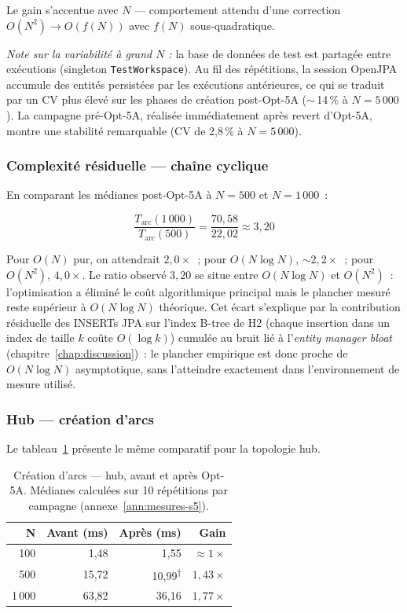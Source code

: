 Le gain s'accentue avec $N$ --- comportement attendu d'une correction
$O(N^2) \rightarrow O(f(N))$ avec $f(N)$ sous-quadratique.

\textit{Note sur la variabilité à grand $N$ :} la base de données de test
est partagée entre exécutions (singleton \texttt{TestWorkspace}). Au fil
des répétitions, la session OpenJPA accumule des entités persistées par
les exécutions antérieures, ce qui se traduit par un CV plus élevé sur
les phases de création post-Opt-5A ($\sim$\,14\,\% à $N=5\,000$). La
campagne pré-Opt-5A, réalisée immédiatement après revert d'Opt-5A,
montre une stabilité remarquable (CV de 2,8\,\% à $N=5\,000$).

\subsubsection{Complexité résiduelle --- chaîne cyclique}

En comparant les médianes post-Opt-5A à $N = 500$ et $N = 1\,000$~:

$$\frac{T_{\text{arc}}(1\,000)}{T_{\text{arc}}(500)} = \frac{70{,}58}{22{,}02} \approx 3{,}20$$

Pour $O(N)$ pur, on attendrait $2{,}0\times$~; pour $O(N \log N)$,
$\sim 2{,}2\times$~; pour $O(N^2)$, $4{,}0\times$. Le ratio observé
$3{,}20$ se situe entre $O(N \log N)$ et $O(N^2)$~: l'optimisation a
éliminé le coût algorithmique principal mais le plancher mesuré reste
supérieur à $O(N \log N)$ théorique. Cet écart s'explique par la
contribution résiduelle des INSERTs JPA sur l'index B-tree de H2
(chaque insertion dans un index de taille $k$ coûte $O(\log k)$) cumulée
au bruit lié à l'\emph{entity manager bloat} (chapitre~\ref{chap:discussion})~:
le plancher empirique est donc proche de $O(N \log N)$ asymptotique, sans
l'atteindre exactement dans l'environnement de mesure utilisé.

\subsubsection{Hub — création d'arcs}

Le tableau~\ref{tab:sc5-arc-hub-apres} présente le même comparatif
pour la topologie hub.

\begin{table}[h]
\centering
\caption{Création d'arcs --- hub, avant et après Opt-5A. Médianes
calculées sur 10 répétitions par campagne (annexe~\ref{ann:mesures-s5}).}
\label{tab:sc5-arc-hub-apres}
\begin{tabular}{rrrr}
\hline
\textbf{N} & \textbf{Avant (ms)} & \textbf{Après (ms)} & \textbf{Gain} \\
\hline
100    &  1,48 &  1,55 & $\approx 1\times$ \\
500    & 15,72 & 10,99\textsuperscript{$\dagger$} & $1{,}43\times$ \\
1\,000 & 63,82 & 36,16 & $1{,}77\times$    \\
\hline
\end{tabular}
\end{table}

